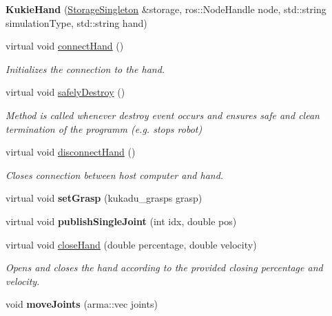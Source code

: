 \begin{DoxyCompactItemize}
\item 
{\bfseries Kukie\+Hand} (\hyperlink{classkukadu_1_1StorageSingleton}{Storage\+Singleton} \&storage, ros\+::\+Node\+Handle node, std\+::string simulation\+Type, std\+::string hand)\hypertarget{classkukadu_1_1KukieHand_a4283b3849f083f7469be19eafbb4ff63}{}\label{classkukadu_1_1KukieHand_a4283b3849f083f7469be19eafbb4ff63}

\item 
virtual void \hyperlink{classkukadu_1_1KukieHand_aaccb81a60e09b915c8fd4b0acfe76d2f}{connect\+Hand} ()
\begin{DoxyCompactList}\small\item\em Initializes the connection to the hand. \end{DoxyCompactList}\item 
virtual void \hyperlink{classkukadu_1_1KukieHand_ad4f676de2f32cee7c191e4fbf42cb133}{safely\+Destroy} ()
\begin{DoxyCompactList}\small\item\em Method is called whenever destroy event occurs and ensures safe and clean termination of the programm (e.\+g. stops robot) \end{DoxyCompactList}\item 
virtual void \hyperlink{classkukadu_1_1KukieHand_aac5de8a17e7592b4c0c693fe6d06e0e9}{disconnect\+Hand} ()
\begin{DoxyCompactList}\small\item\em Closes connection between host computer and hand. \end{DoxyCompactList}\item 
virtual void {\bfseries set\+Grasp} (kukadu\+\_\+grasps grasp)\hypertarget{classkukadu_1_1KukieHand_a7aa80edce6f8b938eea2ca1826bf230a}{}\label{classkukadu_1_1KukieHand_a7aa80edce6f8b938eea2ca1826bf230a}

\item 
virtual void {\bfseries publish\+Single\+Joint} (int idx, double pos)\hypertarget{classkukadu_1_1KukieHand_a3b11fd1af2a71838a4cb87b96d7d14e6}{}\label{classkukadu_1_1KukieHand_a3b11fd1af2a71838a4cb87b96d7d14e6}

\item 
virtual void \hyperlink{classkukadu_1_1KukieHand_ace726db985affda8ed5f49464f7aab04}{close\+Hand} (double percentage, double velocity)
\begin{DoxyCompactList}\small\item\em Opens and closes the hand according to the provided closing percentage and velocity. \end{DoxyCompactList}\item 
void {\bfseries move\+Joints} (arma\+::vec joints)\hypertarget{classkukadu_1_1KukieHand_a548ed81cee0f111abc4c6b127b075da4}{}\label{classkukadu_1_1KukieHand_a548ed81cee0f111abc4c6b127b075da4}


\end{DoxyCompactItemize}
